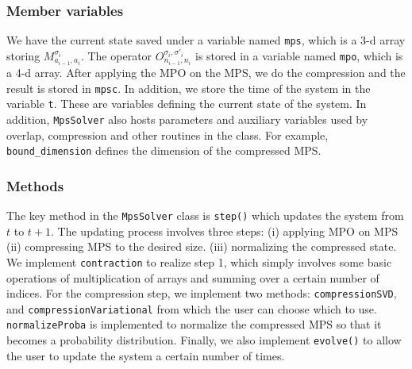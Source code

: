 \documentclass[english]{article}[12pt]
\begin{document}
\subsubsection{Member variables}
We have the current state saved under a variable named \texttt{mps}, which is a 3-d array storing $M^{\sigma_i}_{a_{i-1},a_i}$. The operator $O^{\sigma_i, \sigma'_i}_{n_{i-1}, n_i}$ is stored in a variable named \texttt{mpo}, which is a 4-d array. After applying the MPO on the MPS, we do the compression and the result is stored in \texttt{mpsc}. In addition, we store the time of the system in the variable \texttt{t}. These are variables defining the current state of the system. In addition, \texttt{MpsSolver} also hosts parameters and auxiliary variables used by overlap, compression and other routines in the class. For example, \texttt{bound\_dimension} defines the dimension of the compressed MPS.
\subsubsection{Methods}
The key method in the \texttt{MpsSolver} class is \texttt{step()} which updates the system from $t$ to $t+1$. The updating process involves three steps: (i) applying MPO on MPS (ii) compressing MPS to the desired size. (iii) normalizing the compressed state. We implement \texttt{contraction} to realize step 1, which simply involves some basic operations of multiplication of arrays and summing over a certain number of indices. For the compression step, we implement two methods: \texttt{compressionSVD}, and \texttt{compressionVariational} from which the user can choose which to use. \texttt{normalizeProba} is implemented to normalize the compressed MPS so that it becomes a probability distribution. Finally, we also implement \texttt{evolve()} to allow the user to update the system a certain number of times.
\end{document}
